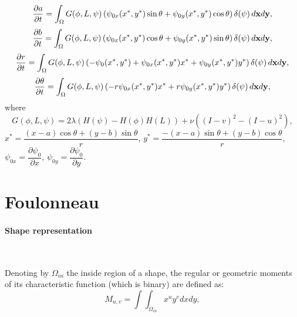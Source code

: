 \begin{equation}
  \label{eq:evol_chan2005_a}
   \frac{\partial a}{\partial t} = \int_\Omega G(\phi, L, \psi) \left( \psi_{0x}(x^*, y^*) \sin \theta + \psi_{0y}(x^*,y^*) \cos \theta \right) \delta(\psi) \, d\mathbf{x}d\mathbf{y},
\end{equation}
\begin{equation}
  \label{eq:evol_chan2005_b}
   \frac{\partial b}{\partial t} = \int_\Omega G(\phi, L, \psi) \left( \psi_{0x}(x^*, y^*) \cos \theta + \psi_{0y}(x^*,y^*) \sin \theta \right) \delta(\psi) \, d\mathbf{x}d\mathbf{y},
\end{equation}
\begin{equation}
  \label{eq:evol_chan2005_r}
   \frac{\partial r}{\partial t} = \int_\Omega G(\phi, L, \psi) \left( -\psi_0(x^*, y^*) + \psi_{0x}(x^*, y^*) x^* + \psi_{0y}(x^*,y^*) y^* \right) \delta(\psi) \, d\mathbf{x}d\mathbf{y},
\end{equation}
\begin{equation}
  \label{eq:evol_chan2005_theta}
   \frac{\partial \theta}{\partial t} = \int_\Omega G(\phi, L, \psi) \left( -r \psi_{0x}(x^*, y^*) x^* + r \psi_{0y}(x^*,y^*) y^* \right) \delta(\psi) \, d\mathbf{x}d\mathbf{y},
\end{equation}
where
\begin{equation}
  \label{eq:evol_chan2005_G}
   G(\phi, L, \psi) = 2\lambda (H(\psi) - H(\phi)H(L)) + \nu \left( (I - v)^2 - (I - u)^2 \right),
\end{equation}
$x^* = \dfrac{(x-a) \cos \theta + (y - b) \sin \theta}{r}$, $y^* = \dfrac{-(x-a) \sin \theta + (y - b) \cos \theta}{r}$, $\psi_{0x} = \dfrac{\partial \psi_0}{\partial x}$, $\psi_{0y} = \dfrac{\partial \psi_0}{\partial y}$.



\newpage
\section[Foulonneau \etal]{Foulonneau  \cite{Foulonneau2006}}
\label{sec:shape-foulonneau}

\paragraph{Shape representation}
~\par \vspace{0.3cm}
Denoting by $\Omega_{in}$ the inside region of a shape, the regular or geometric moments of its characteristic function (which is binary) are defined as:
\begin{equation}
  \label{eq:moment_geometrique}
   M_{u,v} = \int\int_{\Omega_{in}}x^u y^v dxdy,
\end{equation}

